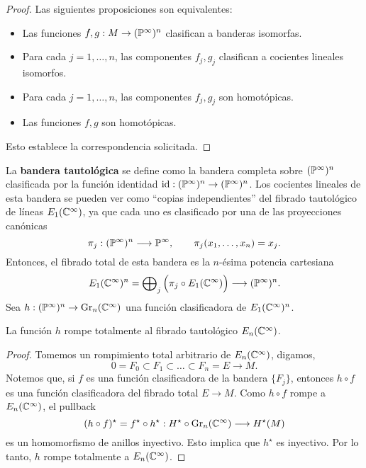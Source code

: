 \begin{proof}
Las siguientes proposiciones son equivalentes:
\begin{itemize}
    \itemsep 0em
    \item Las funciones $f, g : M \to (\P^\infty)^n$ clasifican a banderas isomorfas.
    \item Para cada $j = 1, \dots, n$, las componentes $f_j, g_j$ clasifican a cocientes lineales isomorfos.
    \item Para cada $j = 1, \dots, n$, las componentes $f_j, g_j$ son homotópicas.
    \item Las funciones $f, g$ son homotópicas.
\end{itemize}
Esto establece la correspondencia solicitada.
\end{proof}

La \textbf{bandera tautológica} se define como la bandera completa sobre $(\P^\infty)^n$ clasificada por la función identidad $\id : (\P^\infty)^n \to (\P^\infty)^n$. Los cocientes lineales de esta bandera se pueden ver como ``copias independientes'' del fibrado tautológico de líneas $E_1(\C^\infty)$, ya que cada uno es clasificado por una de las proyecciones canónicas
$$\pi_j : (\P^\infty)^n \longrightarrow \P^\infty, \qquad \pi_j(x_1, \dots, x_n) = x_j.$$
Entonces, el fibrado total de esta bandera es la $n$-ésima potencia cartesiana
$$E_1(\C^\infty)^n = \bigoplus \nolimits_j \Big( \pi_j \circ E_1(\C^\infty) \Big) \longrightarrow (\P^\infty)^n.$$
Sea $h : (\P^\infty)^n \to \Gr_n(\C^\infty)$ una función clasificadora de $E_1(\C^\infty)^n$.

\begin{lemma}
La función $h$ rompe totalmente al fibrado tautológico $E_n(\C^\infty)$.
\end{lemma}

\begin{proof}
Tomemos un rompimiento total arbitrario de $E_n(\C^\infty)$, digamos,
$$0 = F_0 \subset F_1 \subset \dots \subset F_n = E \longrightarrow M.$$
Notemos que, si $f$ es una función clasificadora de la bandera $\{ F_j \}$, entonces $h \circ f$ es una función clasificadora del fibrado total $E \to M$. Como $h \circ f$ rompe a $E_n(\C^\infty)$, el pullback
$$(h \circ f)^\star = f^\star \circ h^\star : H^\star \circ \Gr_n(\C^\infty) \longrightarrow H^\star(M)$$
es un homomorfismo de anillos inyectivo. Esto implica que $h^\star$ es inyectivo. Por lo tanto, $h$ rompe totalmente a $E_n(\C^\infty)$.
\end{proof}

